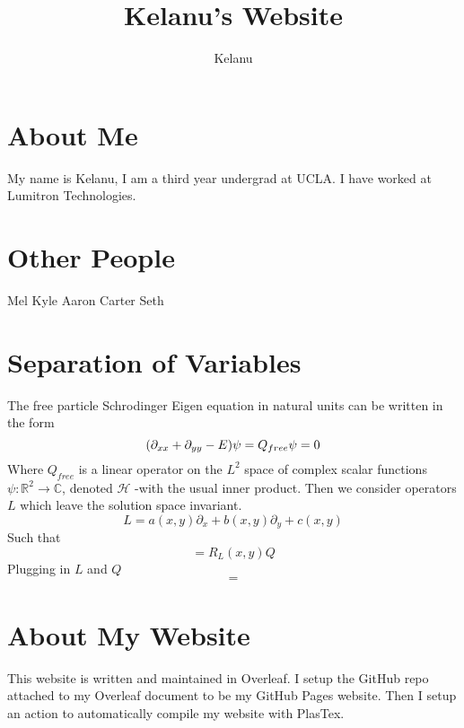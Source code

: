 \documentclass{article}
\title{Kelanu's Website}
\author{Kelanu}
\begin{document}
\maketitle
\section{About Me}
My name is Kelanu, I am a third year undergrad at UCLA. I have worked at Lumitron Technologies.

\newpage
\section{Other People}
Mel
Kyle
Aaron
Carter
Seth

\newpage
\section{Separation of Variables}
The free particle Schrodinger Eigen equation in natural units  can be written in the form
\begin{equation}
        (\partial_{xx}+\partial_{yy}-E)\psi = Q_{free}\psi = 0\\
\end{equation}
Where $Q_{free}$ is a linear operator on the $L^2$ space of complex scalar functions $\psi: \mathbb{R}^2 \rightarrow \mathbb{C}$, denoted $\mathcal{H}$ -with the usual inner product.
Then we consider operators $L$ which leave the solution space invariant.
\begin{equation}
    L = a(x,y)\partial_x+b(x,y)\partial_y+c(x,y)
\end{equation}
Such that
\begin{equation}
    [L,Q] = R_L(x,y) Q
\end{equation}
Plugging in $L$ and $Q$
\begin{equation}
    [L,Q] = 
\end{equation}

\newpage
\section{About My Website}
This website is written and maintained in Overleaf. I setup the GitHub repo attached to my Overleaf document to be my GitHub Pages website. Then I setup an action to automatically compile my website with PlasTex.
\end{document}
